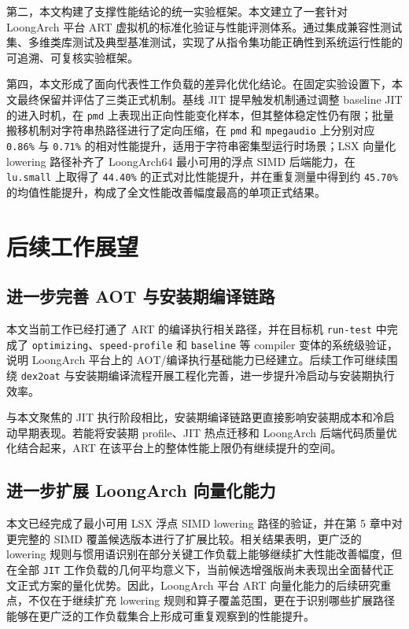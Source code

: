 第二，本文构建了支撑性能结论的统一实验框架。本文建立了一套针对 LoongArch 平台 ART 虚拟机的标准化验证与性能评测体系。通过集成兼容性测试集、多维类库测试及典型基准测试，实现了从指令集功能正确性到系统运行性能的可追溯、可复核实验框架。

第四，本文形成了面向代表性工作负载的差异化优化结论。在固定实验设置下，本文最终保留并评估了三类正式机制。基线 JIT 提早触发机制通过调整 baseline JIT 的进入时机，在 \texttt{pmd} 上表现出正向性能变化样本，但其整体稳定性仍有限；批量搬移机制对字符串热路径进行了定向压缩，在 \texttt{pmd} 和 \texttt{mpegaudio} 上分别对应 \texttt{0.86\%} 与 \texttt{0.71\%} 的相对性能提升，适用于字符串密集型运行时场景；LSX 向量化 lowering 路径补齐了 LoongArch64 最小可用的浮点 SIMD 后端能力，在 \texttt{lu.small} 上取得了 \texttt{44.40\%} 的正式对比性能提升，并在重复测量中得到约 \texttt{45.70\%} 的均值性能提升，构成了全文性能改善幅度最高的单项正式结果。

\section{后续工作展望}

\subsection{进一步完善 AOT 与安装期编译链路}

本文当前工作已经打通了 ART 的编译执行相关路径，并在目标机 \texttt{run-test} 中完成了 \texttt{optimizing}、\texttt{speed-profile} 和 \texttt{baseline} 等 compiler 变体的系统级验证，说明 LoongArch 平台上的 AOT/编译执行基础能力已经建立。后续工作可继续围绕 \texttt{dex2oat} 与安装期编译流程开展工程化完善，进一步提升冷启动与安装期执行效率。

与本文聚焦的 JIT 执行阶段相比，安装期编译链路更直接影响安装期成本和冷启动早期表现。若能将安装期 profile、JIT 热点迁移和 LoongArch 后端代码质量优化结合起来，ART 在该平台上的整体性能上限仍有继续提升的空间\citep{AndroidRuntime2024,ArtJitCompiler2024}。

\subsection{进一步扩展 LoongArch 向量化能力}

本文已经完成了最小可用 LSX 浮点 SIMD lowering 路径的验证，并在第 5 章中对更完整的 SIMD 覆盖候选版本进行了扩展比较。相关结果表明，更广泛的 lowering 规则与惯用语识别在部分关键工作负载上能够继续扩大性能改善幅度，但在全部 \texttt{JIT} 工作负载的几何平均意义下，当前候选增强版尚未表现出全面替代正文正式方案的量化优势。因此，LoongArch 平台 ART 向量化能力的后续研究重点，不仅在于继续扩充 lowering 规则和算子覆盖范围，更在于识别哪些扩展路径能够在更广泛的工作负载集合上形成可重复观察到的性能提升。

